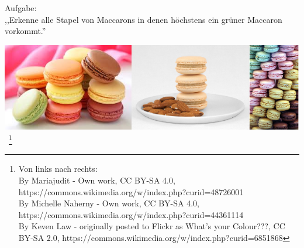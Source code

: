\begin{Bsp}Aufgabe: 
  \\
  \label{Bsp:3.1}
  ,,Erkenne alle Stapel von Maccarons in denen höchstens ein grüner Maccaron vorkommt.''
\begin{center}
  \includegraphics[scale=0.4]{macaron-stacks.png}~\footnote{
  \tiny Von links nach rechts: \\
By Mariajudit - Own work, CC BY-SA 4.0, https://commons.wikimedia.org/w/index.php?curid=48726001
  \\
By Michelle Naherny - Own work, CC BY-SA 4.0, https://commons.wikimedia.org/w/index.php?curid=44361114
  \\
By Keven Law - originally posted to Flickr as What's your Colour???, CC BY-SA 2.0, https://commons.wikimedia.org/w/index.php?curid=6851868
}


\end{center}
\end{Bsp}
